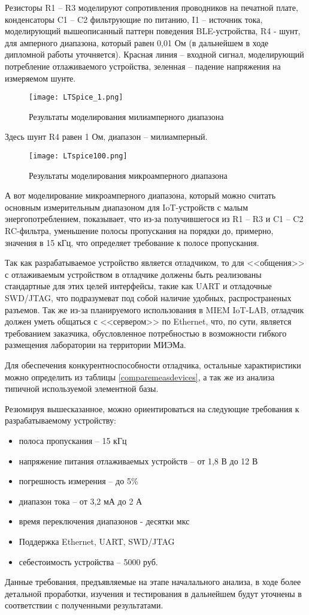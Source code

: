 Резисторы R1 -- R3 моделируют сопротивления проводников на печатной плате, конденсаторы C1 -- C2 фильтрующие 
по питанию, I1 -- источник тока, моделирующий вышеописанный паттерн поведения BLE-устройства,
R4 - шунт, для амперного диапазона, который равен 0,01 Ом (в дальнейшем в ходе дипломной работы уточняется). 
Красная линия -- входной сигнал, моделирующий потребление отлаживаемого устройства, 
зеленная -- падение напряжения на измеряемом шунте. 

\begin{figure}[H]
  \centering
  \texttt{[image: LTSpice\_1.png]}
  \caption{Результаты моделирования милиамперного диапазона }
  \label{ris:LTSpice_1}
\end{figure}

Здесь шунт R4 равен 1 Ом, диапазон -- милиамперный. 

\begin{figure}[H]
  \centering
  \texttt{[image: LTspice100.png]}
  \caption{Результаты моделирования микроамперного диапазона }
  \label{ris:LTSpice100}
\end{figure}

А вот моделирование микроамперного диапазона, который можно считать основным измерительным диапазоном для 
IoT-устройств с малым энергопотреблением, показывает, что из-за получившегося из R1 -- R3 и C1 -- C2 RC-фильтра,
уменьшение полосы пропускания на порядки до, примерно, значения в  15 кГц, что определяет требование 
к полосе пропускания.

Так как разрабатываемое устройство является отладчиком, то для <<общения>> с отлаживаемым устройством 
в отладчике должены быть реализованы стандартные для этих целей интерфейсы, такие как UART и отладочные 
SWD/JTAG, что подразумеват под собой наличие удобных, распространеных разъемов. Так же из-за планируемого 
использования в MIEM IoT-LAB, отладчик должен уметь общаться с <<сервером>> по Ethernet, что, по сути,
является требованием заказчика, обусловленное потребностью в возможности гибкого размещения лаборатории на 
территории МИЭМа.  

Для обеспечения конкурентноспособности отладчика, остальные характиристики можно определить 
из таблицы \ref{comparemeasdevices}, а так же из анализа типичной используемой элементной базы.

Резюмируя вышесказанное, можно ориентироваться на следующие требования к разрабатываемому 
устройству:
\begin{itemize}
    \item полоса пропускания -- 15 кГц
    \item напряжение питания отлаживаемых устройств -- от 1,8 В до 12 В
    \item погрешность измерения -- до 5\%
    \item диапазон тока -- от 3,2 мА до 2 А
    \item время переключения диапазонов - десятки мкс
    \item Поддержка Ethernet, UART, SWD/JTAG
    \item себестоимость устройства -- 5000 руб.
\end{itemize}

Данные требования, предъявляемые на этапе началального анализа, в ходе более детальной проработки,
изучения и тестирования в дальнейшем будут уточнены в соответствии с полученными результатами.
